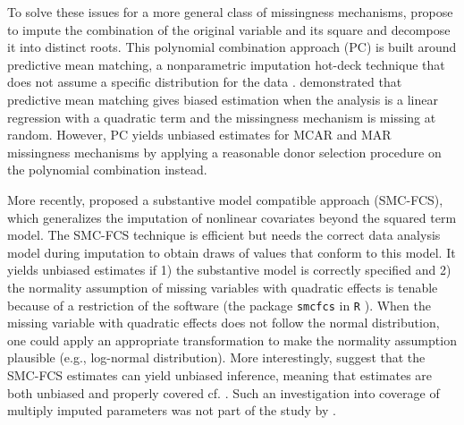 	To solve these issues for a more general class of missingness mechanisms, \citet{Vink2013} propose to impute the combination of the original variable and its square and decompose it into distinct roots. This polynomial combination approach (PC) is built around predictive mean matching, a nonparametric imputation hot-deck technique that does not assume a specific distribution for the data \citep{rubin1986statistical, little1988missing}. \citet{seaman2012multiple} demonstrated that predictive mean matching gives biased estimation when the analysis is a linear regression with a quadratic term and the missingness mechanism is missing at random. However, PC yields unbiased estimates for MCAR and MAR missingness mechanisms by applying a reasonable donor selection procedure on the polynomial combination instead. 
	
	More recently, \citet{bartlett2015multiple} proposed a substantive model compatible approach (SMC-FCS), which generalizes the imputation of nonlinear covariates beyond the squared term model. The SMC-FCS technique is efficient but needs the correct data analysis model during imputation to obtain draws of values that conform to this model. It yields unbiased estimates if 1) the substantive model is correctly specified and 2) the normality assumption of missing variables with quadratic effects is tenable because of a restriction of the software (the package \texttt{smcfcs} \citep{smcfcs2021} in \texttt{R} \citep{R2018}). When the missing variable with quadratic effects does not follow the normal distribution, one could apply an appropriate transformation to make the normality assumption plausible (e.g., log-normal distribution). More interestingly, \citet{bartlett2015multiple} suggest that the SMC-FCS estimates can yield unbiased inference, meaning that estimates are both unbiased and properly covered cf. \citet{neyman1934two}. Such an investigation into coverage of multiply imputed parameters was not part of the study by \citet{Vink2013}.
		
